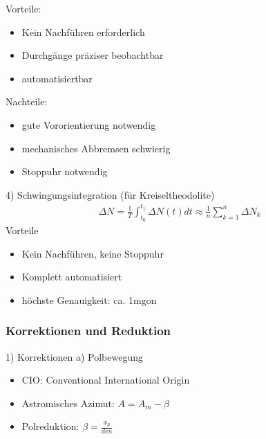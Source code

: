 \documentclass[12pt]{article}
\begin{document}
Vorteile:
\begin{itemize}
	\item Kein Nachführen erforderlich
	\item Durchgänge präziser beobachtbar
	\item automatisiertbar
\end{itemize}
Nachteile:
\begin{itemize}
	\item gute Vororientierung notwendig
	\item mechanisches Abbremsen schwierig
	\item Stoppuhr notwendig
\end{itemize}
4) Schwingungsintegration (für Kreiseltheodolite)
\begin{gather*}
	\Delta N = \frac{1}{T} \int_{t_0}^{t_1} \Delta N(t) dt \approx \frac{1}{n} \sum_{k=1}^{n} \Delta N_k
\end{gather*}
Vorteile
\begin{itemize}
	\item Kein Nachführen, keine Stoppuhr
	\item Komplett automatisiert
	\item höchste Genauigkeit: ca. 1mgon
\end{itemize}
\subsubsection{Korrektionen und Reduktion}
1) Korrektionen \newline
a) Polbewegung \newline
\begin{itemize}
	\item CIO: Conventional International Origin
	\item Astromisches Azimut: $A = A_m - \beta$
	\item Polreduktion: $\beta = \frac{x_p}{den}$
\end{itemize}
\end{document}
